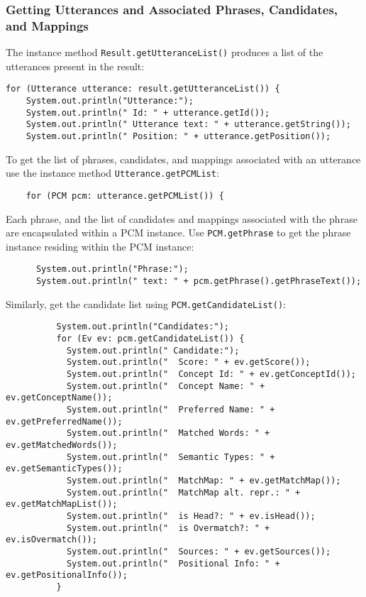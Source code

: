 \documentclass[11pt]{article}
\begin{document}
\subsubsection{Getting Utterances and Associated Phrases, Candidates, and Mappings}
\label{Getting Utterances and Associated Phrases, Candidates, and Mappings}

The instance method \texttt{Result.getUtteranceList()} produces a list of
the utterances present in the result:

\begin{verbatim}
for (Utterance utterance: result.getUtteranceList()) {
	System.out.println("Utterance:");
	System.out.println(" Id: " + utterance.getId());
	System.out.println(" Utterance text: " + utterance.getString());
	System.out.println(" Position: " + utterance.getPosition());
\end{verbatim}

To get the list of phrases, candidates, and mappings associated with
an utterance use the instance method \texttt{Utterance.getPCMList}:

\begin{verbatim}
	for (PCM pcm: utterance.getPCMList()) {
\end{verbatim}

Each phrase, and the list of candidates and mappings associated with
the phrase are encapsulated within a PCM instance.  Use \texttt{PCM.getPhrase}
to get the phrase instance residing within the PCM instance:

\begin{verbatim}
	  System.out.println("Phrase:");
	  System.out.println(" text: " + pcm.getPhrase().getPhraseText());
\end{verbatim}

Similarly, get the candidate list using \texttt{PCM.getCandidateList()}:

\begin{verbatim}
          System.out.println("Candidates:");
          for (Ev ev: pcm.getCandidateList()) {
            System.out.println(" Candidate:");
            System.out.println("  Score: " + ev.getScore());
            System.out.println("  Concept Id: " + ev.getConceptId());
            System.out.println("  Concept Name: " + ev.getConceptName());
            System.out.println("  Preferred Name: " + ev.getPreferredName());
            System.out.println("  Matched Words: " + ev.getMatchedWords());
            System.out.println("  Semantic Types: " + ev.getSemanticTypes());
            System.out.println("  MatchMap: " + ev.getMatchMap());
            System.out.println("  MatchMap alt. repr.: " + ev.getMatchMapList());
            System.out.println("  is Head?: " + ev.isHead());
            System.out.println("  is Overmatch?: " + ev.isOvermatch());
            System.out.println("  Sources: " + ev.getSources());
            System.out.println("  Positional Info: " + ev.getPositionalInfo());
          }
\end{verbatim}
\end{document}
